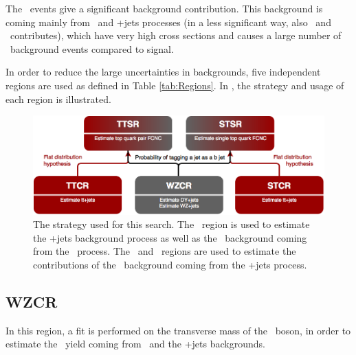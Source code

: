 The \NPL\  events give a significant background contribution. This background is coming mainly from \DY\ and \ttbar+jets processes (in a less significant way, also \WW\ and \tWZ\ contributes), which have very high cross sections and causes a large number of \NPL\  background events compared to signal.

In order to reduce the large uncertainties in backgrounds, five independent regions are used as defined in Table  \ref{tab:Regions}. In , the strategy and usage of each region is illustrated.
\begin{figure}
	\centering
	\includegraphics[width=1.\linewidth]{5_EventSelection/Figures/regions}
	\caption{The strategy used for this search. The \WZCR\ region is used to estimate the \WZ+jets background process as well as the \NPL\ background coming from the \DY\ process. The \TTCR\ and \STCR\ regions are used to estimate the contributions of the \NPL\ background coming from the \ttbar+jets process.}
	\label{fig:regions}
\end{figure}


\subsection{WZCR}
In this region, a fit is performed on the transverse mass of the \PW\ boson, in order to estimate the \NPL\ yield coming from \DY\ and the \WZ+jets backgrounds. 

